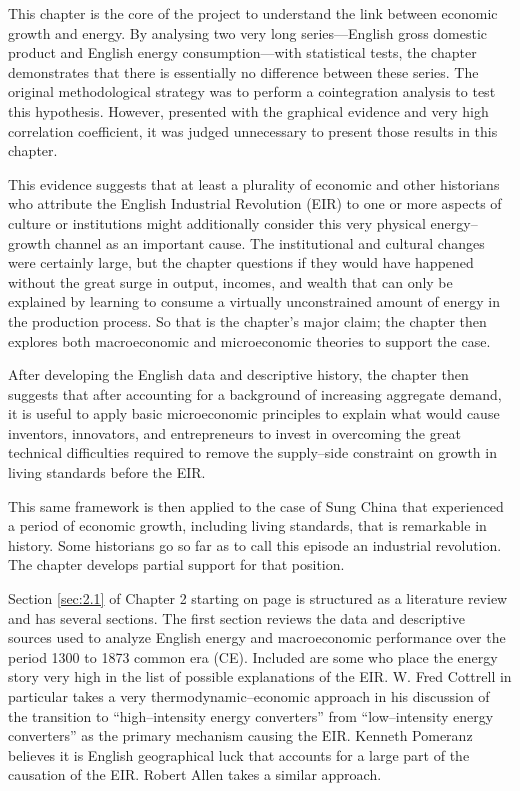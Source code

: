 	This chapter is the core of the project to understand the link between economic growth and energy. By analysing two very long series---English gross domestic product and English energy consumption---with statistical tests, the chapter demonstrates that there is essentially no difference between these series. The original methodological strategy was to perform a cointegration analysis to test this hypothesis. However, presented with the graphical evidence and very high correlation coefficient, it was judged unnecessary to present those results in this chapter.

	This evidence suggests that at least a plurality of economic and other historians who attribute the English Industrial Revolution (EIR) to one or more aspects of culture or institutions might additionally consider this very physical energy--growth channel as an important cause. The institutional and cultural changes were certainly large, but the chapter questions if they would have happened without the great surge in output, incomes, and wealth that can only be explained by learning to consume a virtually unconstrained amount of energy in the production process. So that is the chapter's major claim; the chapter then explores both macroeconomic and microeconomic theories to support the case.
	
	After developing the English data and descriptive history, the chapter then suggests that after accounting for a background of increasing aggregate demand, it is useful to apply basic microeconomic principles to explain what would cause inventors, innovators, and entrepreneurs to invest in overcoming the great technical difficulties required to remove the supply--side constraint on growth in living standards before the EIR.
	
	This same framework is then applied to the case of Sung China that experienced a period of economic growth, including living standards, that is remarkable in history. Some historians go so far as to call this episode an industrial revolution. The chapter develops partial support for that position.

	Section \ref{sec:2.1} of Chapter 2 starting on page \pageref{sec:2.1} is structured as a literature review and has several sections. The first section reviews the data and descriptive sources used to analyze English energy and macroeconomic performance over the period 1300 to 1873 common era (CE). Included are some who place the energy story very high in the list of possible explanations of the EIR. W. Fred Cottrell in particular takes a very thermodynamic--economic approach in his discussion of the transition to ``high--intensity energy converters'' from ``low--intensity energy converters'' as the primary mechanism causing the EIR. Kenneth Pomeranz believes it is English geographical luck that accounts for a large part of the causation of the EIR. Robert Allen takes a similar approach.

